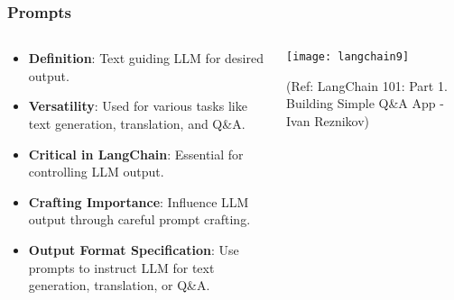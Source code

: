 \begin{frame}[fragile]\frametitle{Prompts}

  \begin{columns}
    \begin{column}{0.5\textwidth}
      \begin{itemize}
        \item \textbf{Definition}: Text guiding LLM for desired output.
        \item \textbf{Versatility}: Used for various tasks like text generation, translation, and Q\&A.
        \item \textbf{Critical in LangChain}: Essential for controlling LLM output.
        \item \textbf{Crafting Importance}: Influence LLM output through careful prompt crafting.
        \item \textbf{Output Format Specification}: Use prompts to instruct LLM for text generation, translation, or Q\&A.

      \end{itemize}
    \end{column}
    \begin{column}{0.5\textwidth}
			\begin{center}
			\texttt{[image: langchain9]}
			\end{center}	  


			{\tiny (Ref: LangChain 101: Part 1. Building Simple Q\&A App - Ivan Reznikov)}
			
		
    \end{column}
  \end{columns}

\end{frame}



